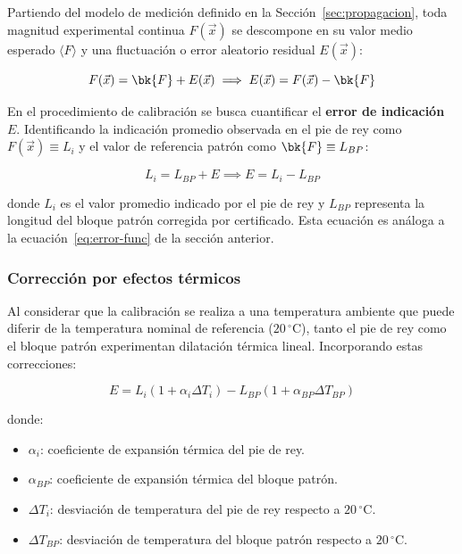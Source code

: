 Partiendo del modelo de medición definido en la Sección~\ref{sec:propagacion}, toda magnitud experimental continua $F(\vec{x})$ se descompone en su valor medio esperado $\langle F \rangle$ y una fluctuación o error aleatorio residual $E(\vec{x})$:

\begin{equation}
  F(\vec{x}) = \bk{F} + E(\vec{x}) \implies E(\vec{x}) = F(\vec{x}) - \bk{F}
  \label{eq:modelo-base}
\end{equation}

En el procedimiento de calibración se busca cuantificar el \textbf{error de indicación} $E$. Identificando la indicación promedio observada en el pie de rey como $F(\vec{x}) \equiv L_i$ y el valor de referencia patrón como $\bk{F} \equiv L_{BP}$:

\begin{equation}
  L_i = L_{BP} + E \implies E = L_i - L_{BP}
  \label{eq:e-base}
\end{equation}

donde $L_i$ es el valor promedio indicado por el pie de rey y $L_{BP}$ representa la longitud del bloque patrón corregida por certificado. Esta ecuación es análoga a la ecuación~\eqref{eq:error-func} de la sección anterior.

\subsubsection*{Corrección por efectos térmicos}

Al considerar que la calibración se realiza a una temperatura ambiente que puede diferir de la temperatura nominal de referencia ($20\,^\circ\text{C}$), tanto el pie de rey como el bloque patrón experimentan dilatación térmica lineal. Incorporando estas correcciones:

\begin{equation}
  E = L_i (1 + \alpha_i \Delta T_i) - L_{BP} (1 + \alpha_{BP} \Delta T_{BP})
  \label{eq:e-termal}
\end{equation}

donde:
\begin{itemize}
\item $\alpha_i$: coeficiente de expansión térmica del pie de rey.
\item $\alpha_{BP}$: coeficiente de expansión térmica del bloque patrón.
\item $\Delta T_i$: desviación de temperatura del pie de rey respecto a $20\,^\circ\text{C}$.
\item $\Delta T_{BP}$: desviación de temperatura del bloque patrón respecto a $20\,^\circ\text{C}$.
\end{itemize}

